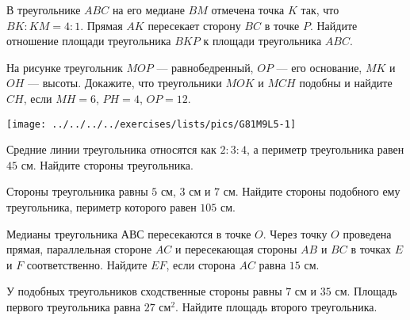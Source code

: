 \begin{class}[number=4]
\begin{listofex}
\begin{minipage}[t]{\picwidth}
		\end{minipage}
		\item В треугольнике \( ABC \) на его медиане \( BM \) отмечена точка \( K \) так, что \( BK:KM=4:1 \). Прямая \( AK \) пересекает сторону \( BC \) в точке \( P \). Найдите отношение площади треугольника \( BKP \) к площади треугольника \( ABC \).
		\item 
		\begin{minipage}[t]{\bodywidth}
			На рисунке треугольник \( MOP \) --- равнобедренный, \( OP \) --- его основание, \( MK \) и \( OH \) --- высоты. Докажите, что треугольники \( MOK \) и \( MCH \) подобны и найдите \( CH \), если \( MH=6 \), \( PH=4 \), \( OP=12 \).
		\end{minipage}
		\hspace{0.02\linewidth}
		\begin{minipage}[t]{\picwidth}
			\texttt{[image: ../../../../exercises/lists/pics/G81M9L5-1]}
		\end{minipage}
			\item Средние линии треугольника относятся как \( 2 : 3 : 4 \), а периметр треугольника равен \( 45 \) см. Найдите стороны треугольника.
		\item Стороны треугольника равны \( 5 \) см, \( 3 \) см и \( 7 \) см. Найдите стороны подобного ему треугольника, периметр которого равен \( 105 \) см.
		\item Медианы треугольника АВС пересекаются в точке \( O \). Через точку \( O \) проведена прямая, параллельная стороне \( AC \) и пересекающая стороны \( AB \) и \( BC \) в точках \( E \) и \( F \) соответственно. Найдите \( EF \), если сторона \( AC \) равна \( 15 \) см.
		\item  У подобных треугольников сходственные стороны равны \( 7 \) см и \( 35 \) см. Площадь первого треугольника равна \( 27 \) см\( ^{2} \). Найдите площадь второго треугольника.
	\end{listofex}
\end{class}
